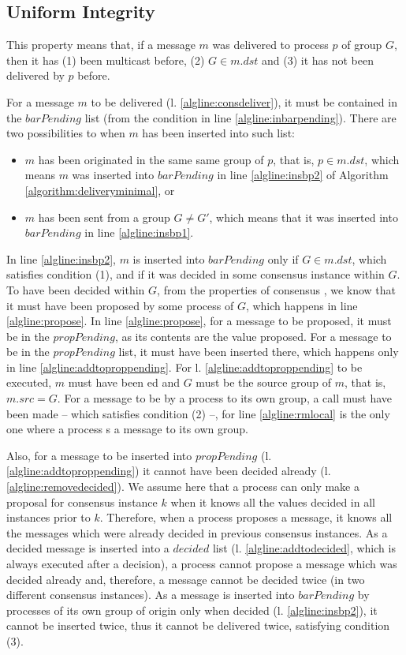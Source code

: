 \documentclass[times, 10pt]{article}
\begin{document}
\subsection{Uniform Integrity}

This property means that, if a message $m$ was delivered to process $p$ of group $G$, then it has (1) been multicast before, (2) $G \in m.dst$ and (3) it has not been delivered by $p$ before.

For a message $m$ to be delivered (l. \ref{algline:consdeliver}), it must be contained in the $barPending$ list (from the condition in line \ref{algline:inbarpending}).  There are two possibilities to when $m$ has been inserted into such list:
\begin{itemize}
  \item $m$ has been originated in the same same group of $p$, that is, $p \in m.dst$, which means $m$ was inserted into $barPending$ in line \ref{algline:insbp2} of Algorithm \ref{algorithm:deliveryminimal}, or
  \item $m$ has been sent from a group $G \neq G'$, which means that it was inserted into $barPending$ in line \ref{algline:insbp1}. 
\end{itemize}

In line \ref{algline:insbp2}, $m$ is inserted into $barPending$ only if $G \in m.dst$, which satisfies condition (1), and if it was decided in some consensus instance within $G$. To have been decided within $G$, from the properties of consensus \cite{lamport1998ptp}, we know that it must have been proposed by some process of $G$, which happens in line \ref{algline:propose}. In line \ref{algline:propose}, for a message to be proposed, it must be in the $propPending$, as its contents are the value proposed. For a message to be in the $propPending$ list, it must have been inserted there, which happens only in line \ref{algline:addtoproppending}. For l. \ref{algline:addtoproppending} to be executed, $m$ must have been \rmd{}ed and $G$ must be the source group of $m$, that is, $m.src = G$. For a message to be \rmc{} by a process to its own group, a  call must have been made -- which satisfies condition (2) --, for line \ref{algline:rmlocal} is the only one where a process \rmc{}s a message to its own group. 

Also, for a message to be inserted into $propPending$ (l. \ref{algline:addtoproppending}) it cannot have been decided already (l. \ref{algline:removedecided}). We assume here that a process can only make a proposal for consensus instance $k$ when it knows all the values decided in all instances prior to $k$. Therefore, when a process proposes a message, it knows all the messages which were already decided in previous consensus instances. As a decided message is inserted into a $decided$ list (l. \ref{algline:addtodecided}, which is always executed after a decision), a process cannot propose a message which was decided already and, therefore, a message cannot be decided twice (in two different consensus instances). As a message is inserted into $barPending$ by processes of its own group of origin only when decided (l. \ref{algline:insbp2}), it cannot be inserted twice, thus it cannot be delivered twice, satisfying condition (3).
\end{document}
